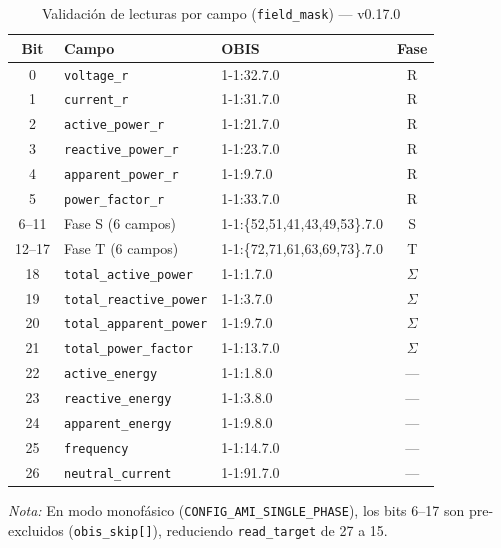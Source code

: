 
\begin{table}[htbp]
\centering
\caption{Validación de lecturas por campo (\texttt{field\_mask}) — v0.17.0}
\label{tab:field-mask-v017}
\begin{tabular}{c l l c}
\toprule
\textbf{Bit} & \textbf{Campo} & \textbf{OBIS} & \textbf{Fase} \\
\midrule
0  & \texttt{voltage\_r}          & 1-1:32.7.0  & R \\
1  & \texttt{current\_r}          & 1-1:31.7.0  & R \\
2  & \texttt{active\_power\_r}    & 1-1:21.7.0  & R \\
3  & \texttt{reactive\_power\_r}  & 1-1:23.7.0  & R \\
4  & \texttt{apparent\_power\_r}  & 1-1:9.7.0   & R \\
5  & \texttt{power\_factor\_r}    & 1-1:33.7.0  & R \\
\midrule
6--11  & Fase S (6 campos)        & 1-1:\{52,51,41,43,49,53\}.7.0 & S \\
12--17 & Fase T (6 campos)        & 1-1:\{72,71,61,63,69,73\}.7.0 & T \\
\midrule
18 & \texttt{total\_active\_power}   & 1-1:1.7.0   & $\Sigma$ \\
19 & \texttt{total\_reactive\_power} & 1-1:3.7.0   & $\Sigma$ \\
20 & \texttt{total\_apparent\_power} & 1-1:9.7.0   & $\Sigma$ \\
21 & \texttt{total\_power\_factor}   & 1-1:13.7.0  & $\Sigma$ \\
\midrule
22 & \texttt{active\_energy}    & 1-1:1.8.0   & --- \\
23 & \texttt{reactive\_energy}  & 1-1:3.8.0   & --- \\
24 & \texttt{apparent\_energy}  & 1-1:9.8.0   & --- \\
\midrule
25 & \texttt{frequency}         & 1-1:14.7.0  & --- \\
26 & \texttt{neutral\_current}  & 1-1:91.7.0  & --- \\
\bottomrule
\end{tabular}

\smallskip
\footnotesize
\textit{Nota:} En modo monofásico (\texttt{CONFIG\_AMI\_SINGLE\_PHASE}), los bits 6--17
son pre-excluidos (\texttt{obis\_skip[]}), reduciendo \texttt{read\_target} de 27 a 15.
\end{table}
